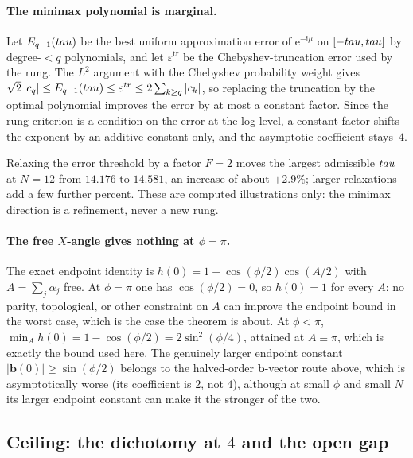 \paragraph{The minimax polynomial is marginal.} Let $E_{q-1}(tau)$ be the best uniform
approximation error of $\mathrm{e}^{-\mathrm{i}\mu}$ on $[-tau,tau]$ by degree-$<q$ polynomials, and
let $\varepsilon^{\mathrm{tr}}$ be the Chebyshev-truncation error used by the rung. The
$L^2$ argument with the Chebyshev probability weight gives
$\sqrt2\,|c_q|\le E_{q-1}(tau)\le\varepsilon^{tr}\le2\sum_{k\ge q}|c_k|$,
so replacing the truncation by the optimal polynomial improves the error by at most a
constant factor. Since the rung criterion is a condition on the error at the log level, a
constant factor shifts the exponent by an additive constant only, and the asymptotic
coefficient stays~$4$.
\begin{remark}
Relaxing the error threshold by a factor $F=2$ moves the largest admissible $tau$ at
$N=12$ from $14.176$ to $14.581$, an increase of about $+2.9\%$; larger relaxations add a few
further percent. These are computed illustrations
only: the minimax direction is a refinement, never a new rung.
\end{remark}

\paragraph{The free $X$-angle gives nothing at $\phi=\pi$.} The exact endpoint identity
is $h(0)=1-\cos(\phi/2)\cos(A/2)$ with $A=\sum_j\alpha_j$ free. At $\phi=\pi$ one has
$\cos(\phi/2)=0$, so $h(0)=1$ for every $A$: no parity, topological, or other constraint
on $A$ can improve the endpoint bound in the worst case, which is the case the theorem is
about. At $\phi<\pi$, $\min_Ah(0)=1-\cos(\phi/2)=2\sin^2(\phi/4)$, attained at
$A\equiv\pi$, which is exactly the bound used here. The genuinely larger endpoint
constant $|\mathbf{b}(0)|\ge\sin(\phi/2)$ belongs to the halved-order $\mathbf{b}$-vector
route above, which is asymptotically worse (its coefficient is $2$, not $4$), although at small
$\phi$ and small $N$ its larger endpoint constant can make it the stronger of the two.

\subsection{Ceiling: the dichotomy at $4$ and the open gap}
\label{sec:ceiling}

